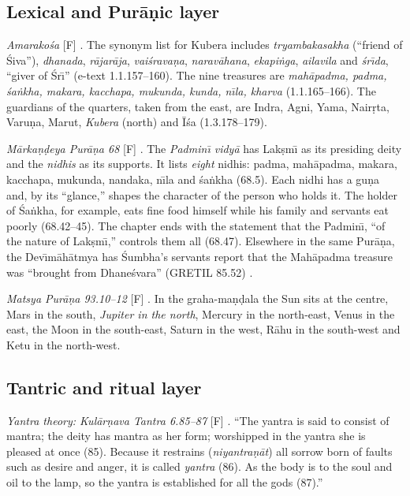 \documentclass[pdflatex,sn-basic]{sn-jnl}
\theoremstyle{thmstyleone}
\theoremstyle{thmstylethree}
\newcommand{\Fact}{\textsf{[F]}}
\begin{document}
\subsection{Lexical and Pur\=a\d nic layer}
\emph{Amarako\'sa} \Fact{} \citep{gretil_amara}. The synonym list for Kubera includes \emph{tryambakasakha} (``friend of \'Siva''), \emph{dhanada}, \emph{r\=ajar\=aja}, \emph{vai\'srava\d na}, \emph{narav\=ahana}, \emph{ekapi\.nga}, \emph{ailavila} and \emph{\'sr\=\i da}, ``giver of \'Sr\=\i'' (e-text 1.1.157--160). The nine treasures are \emph{mah\=apadma, padma, \'sa\.nkha, makara, kacchapa, mukunda, kunda, n\=\i la, kharva} (1.1.165--166). The guardians of the quarters, taken from the east, are Indra, Agni, Yama, Nair\d rta, Varu\d na, Marut, \emph{Kubera} (north) and \=I\'sa (1.3.178--179).

\emph{M\=arka\d n\d deya Pur\=a\d na 68} \Fact{} \citep{dutt1896mkp,els_mkp68}. The \emph{Padmin\=\i{} vidy\=a} has Lak\d sm\=\i{} as its presiding deity and the \emph{nidhis} as its supports. It lists \emph{eight} nidhis: padma, mah\=apadma, makara, kacchapa, mukunda, nandaka, n\=\i la and \'sa\.nkha (68.5). Each nidhi has a gu\d na and, by its ``glance,'' shapes the character of the person who holds it. The holder of \'Sa\.nkha, for example, eats fine food himself while his family and servants eat poorly (68.42--45). The chapter ends with the statement that the Padmin\=\i{}, ``of the nature of Lak\d sm\=\i,'' controls them all (68.47). Elsewhere in the same Pur\=a\d na, the Dev\=\i m\=ah\=atmya has \'Sumbha's servants report that the Mah\=apadma treasure was ``brought from Dhane\'svara'' (GRETIL 85.52) \citep{gretil_mkp}.

\emph{Matsya Pur\=a\d na 93.10--12} \Fact{} \citep{gretil_matsya}. In the graha-ma\d n\d dala the Sun sits at the centre, Mars in the south, \emph{Jupiter in the north}, Mercury in the north-east, Venus in the east, the Moon in the south-east, Saturn in the west, R\=ahu in the south-west and Ketu in the north-west.

\subsection{Tantric and ritual layer}
\emph{Yantra theory: Kul\=ar\d nava Tantra 6.85--87} \Fact{} \citep{kularnava1917}. ``The yantra is said to consist of mantra; the deity has mantra as her form; worshipped in the yantra she is pleased at once (85). Because it restrains (\emph{niyantra\d n\=at}) all sorrow born of faults such as desire and anger, it is called \emph{yantra} (86). As the body is to the soul and oil to the lamp, so the yantra is established for all the gods (87).''
\end{document}
